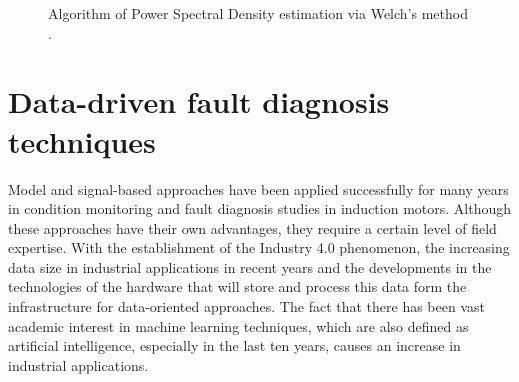\begin{figure}[!h]
	\centering
	\vspace{1cm}
	\caption{Algorithm of Power Spectral Density estimation via Welch's method \cite{solomon1991psd}.}	
	\label{welch}
\end{figure}
\pagebreak

\section{Data-driven fault diagnosis techniques}
Model and signal-based approaches have been applied successfully for many years in condition monitoring and fault diagnosis studies in induction motors. Although these approaches have their own advantages, they require a certain level of field expertise. With the establishment of the Industry 4.0 phenomenon, the increasing data size in industrial applications in recent years and the developments in the technologies of the hardware that will store and process this data form the infrastructure for data-oriented approaches. The fact that there has been vast academic interest in machine learning techniques, which are also defined as artificial intelligence, especially in the last ten years, causes an increase in industrial applications.

